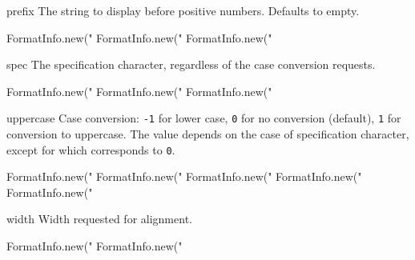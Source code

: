 \begin{urbiscriptapi}
\item[prefix]
  The string to display before positive numbers.  Defaults to empty.
\begin{urbiassert}
FormatInfo.new("%
FormatInfo.new("%
FormatInfo.new("%
\end{urbiassert}

\item[spec]
  The specification character, regardless of the case conversion
  requests.
\begin{urbiassert}
FormatInfo.new("%
FormatInfo.new("%
FormatInfo.new("%
\end{urbiassert}

\item[uppercase]
  Case conversion: \lstinline|-1| for lower case, \lstinline|0| for no
  conversion (default), \lstinline|1| for conversion to uppercase.
  The value depends on the case of specification character, except for
   which corresponds to \lstinline|0|.
\begin{urbiassert}
FormatInfo.new("%
FormatInfo.new("%
FormatInfo.new("%
FormatInfo.new("%
FormatInfo.new("%
\end{urbiassert}

\item[width]
  Width requested for alignment.
\begin{urbiassert}
FormatInfo.new("%
FormatInfo.new("%
\end{urbiassert}
\end{urbiscriptapi}

